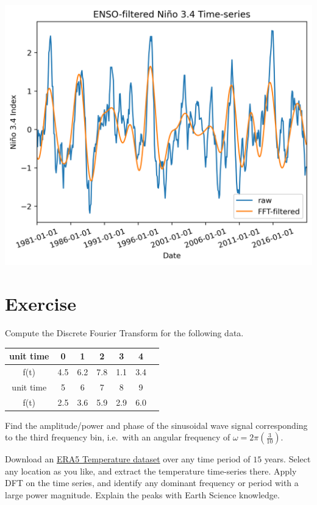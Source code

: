 \begin{center}
\includegraphics[scale=0.8]{graphics/NinoENSOFilter.png}
\end{center}


\section{Exercise}
\begin{Exercise}
Compute the Discrete Fourier Transform for the following data.
\begin{center}
\begin{tabular}{|c|c|c|c|c|c|c|}
\hline
unit time & 0 & 1 & 2 & 3 & 4 \\
\hline
f(t) & 4.5 & 6.2 & 7.8 & 1.1 & 3.4  \\
\hline
unit time & 5 & 6 & 7 & 8 & 9 \\
\hline
f(t) & 2.5 & 3.6 & 5.9 & 2.9 & 6.0\\
\hline
\end{tabular}
\end{center}
Find the amplitude/power and phase of the sinusoidal wave signal corresponding to the third frequency bin, i.e.\ with an angular frequency of $\omega = 2\pi(\frac{3}{10})$. 
\end{Exercise}

\begin{Exercise}
Download an \href{https://cds.climate.copernicus.eu/datasets/reanalysis-era5-single-levels?tab=download}{ERA5 Temperature dataset} over any time period of $15$ years. Select any location as you like, and extract the temperature time-series there. Apply DFT on the time series, and identify any dominant frequency or period with a large power magnitude. Explain the peaks with Earth Science knowledge.
\end{Exercise}

